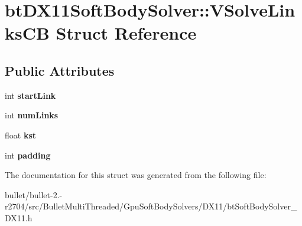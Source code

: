 \hypertarget{structbt_d_x11_soft_body_solver_1_1_v_solve_links_c_b}{\section{bt\+D\+X11\+Soft\+Body\+Solver\+:\+:V\+Solve\+Links\+C\+B Struct Reference}
\label{structbt_d_x11_soft_body_solver_1_1_v_solve_links_c_b}
}
\subsection*{Public Attributes}
\begin{DoxyCompactItemize}
\item 
\hypertarget{structbt_d_x11_soft_body_solver_1_1_v_solve_links_c_b_a21d973663fa1451678b1700535c4a2de}{int {\bfseries start\+Link}}\label{structbt_d_x11_soft_body_solver_1_1_v_solve_links_c_b_a21d973663fa1451678b1700535c4a2de}

\item 
\hypertarget{structbt_d_x11_soft_body_solver_1_1_v_solve_links_c_b_a9c6264db55ce65f77fddf9e8074053e5}{int {\bfseries num\+Links}}\label{structbt_d_x11_soft_body_solver_1_1_v_solve_links_c_b_a9c6264db55ce65f77fddf9e8074053e5}

\item 
\hypertarget{structbt_d_x11_soft_body_solver_1_1_v_solve_links_c_b_a1ca2d1027a3f5df6ad35dd086300d727}{float {\bfseries kst}}\label{structbt_d_x11_soft_body_solver_1_1_v_solve_links_c_b_a1ca2d1027a3f5df6ad35dd086300d727}

\item 
\hypertarget{structbt_d_x11_soft_body_solver_1_1_v_solve_links_c_b_a3ecd992522ddc030b3f12b7fe586f79e}{int {\bfseries padding}}\label{structbt_d_x11_soft_body_solver_1_1_v_solve_links_c_b_a3ecd992522ddc030b3f12b7fe586f79e}

\end{DoxyCompactItemize}


The documentation for this struct was generated from the following file\+:\begin{DoxyCompactItemize}
\item 
bullet/bullet-\/2.-\/r2704/src/\+Bullet\+Multi\+Threaded/\+Gpu\+Soft\+Body\+Solvers/\+D\+X11/bt\+Soft\+Body\+Solver\+\_\+\+D\+X11.\+h\end{DoxyCompactItemize}
